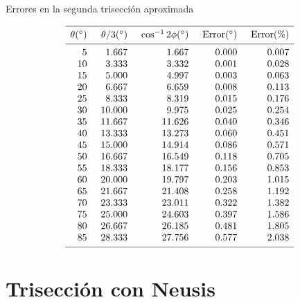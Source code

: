 \begin{table}[t]
\caption{Errores en la segunda trisección aproximada}\label{t.trisect-second-approx}
\[
%
\begin{array}{r@{\hspace{5mm}}r@{\hspace{5mm}}r@{\hspace{5mm}}r@{\hspace{5mm}}r}
\hline
\noalign{\smallskip}
\theta ({}^\circ) & \theta/3 ({}^\circ)& \cos^{-1} 2\phi ({}^\circ) & \mathrm{Error} ({}^\circ) & \mathrm{Error (\%)}\\
\noalign{\smallskip}\hline\noalign{\smallskip}
  5 &    1.667 &    1.667  &     0.000 &    0.007 \\
 10 &    3.333 &    3.332  &     0.001 &    0.028 \\
 15 &    5.000 &    4.997  &     0.003 &    0.063 \\
 20 &    6.667 &    6.659  &     0.008 &    0.113 \\
 25 &    8.333 &    8.319  &     0.015 &    0.176 \\
 30 &   10.000 &    9.975  &     0.025 &    0.254 \\
 35 &   11.667 &   11.626  &     0.040 &    0.346 \\
 40 &   13.333 &   13.273  &     0.060 &    0.451 \\
 45 &   15.000 &   14.914  &     0.086 &    0.571 \\
 50 &   16.667 &   16.549  &     0.118 &    0.705 \\
 55 &   18.333 &   18.177  &     0.156 &    0.853 \\
 60 &   20.000 &   19.797  &     0.203 &    1.015 \\
 65 &   21.667 &   21.408  &     0.258 &    1.192 \\
 70 &   23.333 &   23.011  &     0.322 &    1.382 \\
 75 &   25.000 &   24.603  &     0.397 &    1.586 \\
 80 &   26.667 &   26.185  &     0.481 &    1.805 \\
 85 &   28.333 &   27.756  &     0.577 &    2.038 \\
 \noalign{\smallskip}
 \hline
 \end{array}
\]
\end{table}


\section{Trisección con Neusis}\label{s.neusis}

